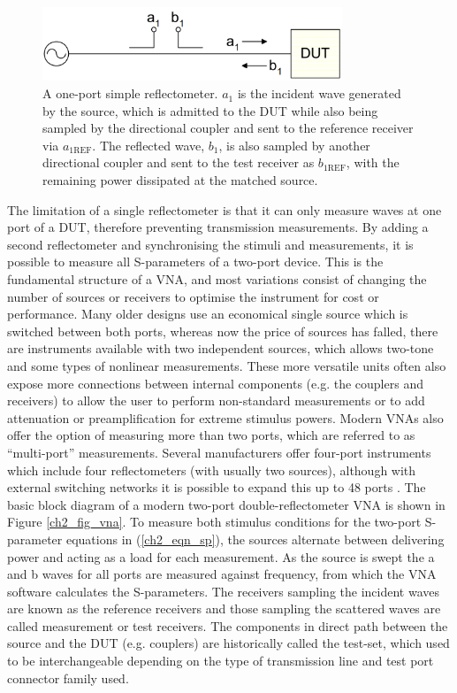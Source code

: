 \documentclass[../thesis/thesis.tex]{subfiles}
\begin{document}
\begin{refsection}
\begin{figure}
	\centering
	\includegraphics[width=0.8\textwidth]{ch2_refl2}
	\caption{A one-port simple reflectometer. $a_1$ is the incident wave generated by the source, which is admitted to the DUT while also being sampled by the directional coupler and sent to the reference receiver via $a_{1\textrm{REF}}$. The reflected wave, $b_1$, is also sampled by another directional coupler and sent to the test receiver as $b_{1\textrm{REF}}$, with the remaining power dissipated at the matched source.}
	\label{ch2_fig_refl}
\end{figure}

The limitation of a single reflectometer is that it can only measure waves at one port of a DUT, therefore preventing transmission measurements. By adding a second reflectometer and synchronising the stimuli and measurements, it is possible to measure all S-parameters of a two-port device. This is the fundamental structure of a VNA, and most variations consist of changing the number of sources or receivers to optimise the instrument for cost or performance. Many older designs use an economical single source which is switched between both ports, whereas now the price of sources has falled, there are instruments available with two independent sources, which allows two-tone and some types of nonlinear measurements. These more versatile units often also expose more  connections between internal components (e.g. the couplers and receivers) to allow the user to perform non-standard measurements or to add attenuation or preamplification for extreme stimulus powers.
Modern VNAs also offer the option of measuring more than two ports, which are referred to as “multi-port” measurements. Several manufacturers offer four-port instruments which include four reflectometers (with usually two sources), although with external switching networks it is possible to expand this up to 48 ports \cite{mj_multiport}.
The basic block diagram of a modern two-port double-reflectometer VNA is shown in Figure \ref{ch2_fig_vna}. To measure both stimulus conditions for the two-port S-parameter equations in (\ref{ch2_eqn_sp}), the sources alternate between delivering power and acting as a load for each measurement. As the source is swept the a and b waves for all ports are measured against frequency, from which the VNA software calculates the S-parameters. The receivers sampling the incident waves are known as the reference receivers and those sampling the scattered waves are called measurement or test receivers. The components in direct path between the source and the DUT (e.g. couplers) are historically called the test-set, which used to be interchangeable depending on the type of transmission line and test port connector family used.


\end{refsection}
\end{document}
